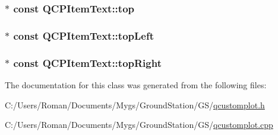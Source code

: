 \subsubsection[{top}]{$\ast$ const Q\+C\+P\+Item\+Text\+::top}\label{class_q_c_p_item_text_a5c87ee162cbbe3d166b97826c8849304}
\hypertarget{class_q_c_p_item_text_a6354d8762182a3502103fabe5fbb8512}{}
\subsubsection[{top\+Left}]{$\ast$ const Q\+C\+P\+Item\+Text\+::top\+Left}\label{class_q_c_p_item_text_a6354d8762182a3502103fabe5fbb8512}
\hypertarget{class_q_c_p_item_text_ad18ac45cb4cc135de1eb78f2e86b6504}{}
\subsubsection[{top\+Right}]{$\ast$ const Q\+C\+P\+Item\+Text\+::top\+Right}\label{class_q_c_p_item_text_ad18ac45cb4cc135de1eb78f2e86b6504}


The documentation for this class was generated from the following files\+:\begin{DoxyCompactItemize}
\item 
C\+:/\+Users/\+Roman/\+Documents/\+Mygs/\+Ground\+Station/\+G\+S/\hyperlink{qcustomplot_8h}{qcustomplot.\+h}\item 
C\+:/\+Users/\+Roman/\+Documents/\+Mygs/\+Ground\+Station/\+G\+S/\hyperlink{qcustomplot_8cpp}{qcustomplot.\+cpp}\end{DoxyCompactItemize}
